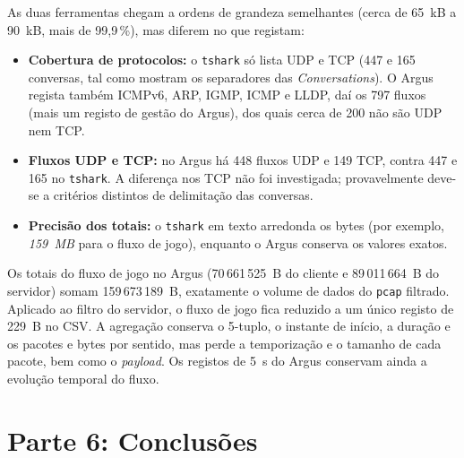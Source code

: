\documentclass[11pt,a4paper]{article}
\begin{document}
As duas ferramentas chegam a ordens de grandeza semelhantes (cerca de 65~kB a 90~kB, mais de 99,9\,\%), mas diferem no que
registam:
\begin{itemize}
  \item \textbf{Cobertura de protocolos:} o \texttt{tshark} só lista UDP e TCP (447 e 165 conversas, tal como mostram os
        separadores das \emph{Conversations}). O Argus regista também ICMPv6, ARP, IGMP, ICMP e LLDP, daí os 797 fluxos
        (mais um registo de gestão do Argus), dos quais cerca de 200 não são UDP nem TCP.
  \item \textbf{Fluxos UDP e TCP:} no Argus há 448 fluxos UDP e 149 TCP, contra 447 e 165 no \texttt{tshark}. A diferença nos
        TCP não foi investigada; provavelmente deve-se a critérios distintos de delimitação das conversas.
  \item \textbf{Precisão dos totais:} o \texttt{tshark} em texto arredonda os bytes (por exemplo, \emph{159~MB} para o fluxo de
        jogo), enquanto o Argus conserva os valores exatos.
\end{itemize}

Os totais do fluxo de jogo no Argus (70\,661\,525~B do cliente e 89\,011\,664~B do servidor) somam 159\,673\,189~B, exatamente
o volume de dados do \texttt{pcap} filtrado. Aplicado ao filtro do servidor, o fluxo de jogo fica reduzido a um único registo de
229~B no CSV. A agregação conserva o 5-tuplo, o instante de início, a duração e os pacotes e bytes por sentido, mas perde a
temporização e o tamanho de cada pacote, bem como o \emph{payload}. Os registos de 5~s do Argus conservam ainda a evolução
temporal do fluxo.

\section{Parte 6: Conclusões}
\end{document}
